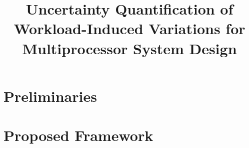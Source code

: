 \documentclass{sig-alternate}
\begin{document}
  \title{Uncertainty Quantification of Workload-Induced Variations for Multiprocessor System Design}

  \maketitle

  \begin{abstract}
    
  \end{abstract}

  \section{Preliminaries}
  

  \section{Proposed Framework}
  


  \printbibliography
\end{document}
